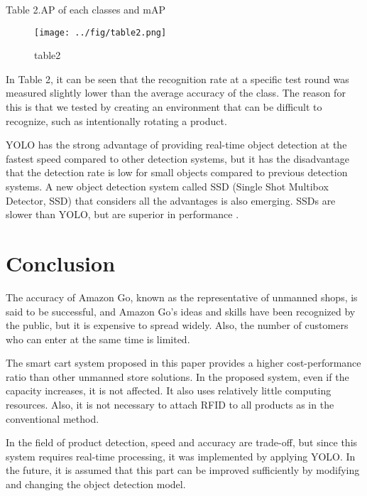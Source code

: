 \documentclass[smallextended]{svjour3}       %
\begin{document}
Table 2.AP of each classes and mAP

\begin{figure}
\centering
\texttt{[image: ../fig/table2.png]}
\caption{table2}
\end{figure}

In Table 2, it can be seen that the recognition rate at a specific test
round was measured slightly lower than the average accuracy of the
class. The reason for this is that we tested by creating an environment
that can be difficult to recognize, such as intentionally rotating a
product.

YOLO has the strong advantage of providing real-time object detection at
the fastest speed compared to other detection systems, but it has the
disadvantage that the detection rate is low for small objects compared
to previous detection systems. A new object detection system called SSD
(Single Shot Multibox Detector, SSD) that considers all the advantages
is also emerging. SSDs are slower than YOLO, but are superior in
performance \cite{ren2015faster, liu2016ssd}.

\hypertarget{conclusion}{%
\section{Conclusion}\label{conclusion}}

The accuracy of Amazon Go, known as the representative of unmanned
shops, is said to be successful, and Amazon Go's ideas and skills have
been recognized by the public, but it is expensive to spread widely.
Also, the number of customers who can enter at the same time is limited.

The smart cart system proposed in this paper provides a higher
cost-performance ratio than other unmanned store solutions. In the
proposed system, even if the capacity increases, it is not affected. It
also uses relatively little computing resources. Also, it is not
necessary to attach RFID to all products as in the conventional method.

In the field of product detection, speed and accuracy are trade-off, but
since this system requires real-time processing, it was implemented by
applying YOLO. In the future, it is assumed that this part can be
improved sufficiently by modifying and changing the object detection
model.



\end{document}
